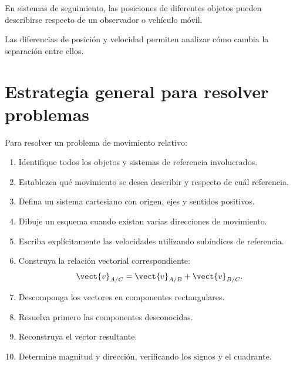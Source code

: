 \begin{aplicacion}

En sistemas de seguimiento, las posiciones
de diferentes objetos pueden describirse
respecto de un observador o vehículo móvil.

Las diferencias de posición y velocidad
permiten analizar cómo cambia la separación
entre ellos.

\end{aplicacion}


\section{Estrategia general para resolver problemas}

\begin{estrategia}

Para resolver un problema de movimiento relativo:

\begin{enumerate}

    \item Identifique todos los objetos y sistemas
    de referencia involucrados.

    \item Establezca qué movimiento se desea
    describir y respecto de cuál referencia.

    \item Defina un sistema cartesiano con origen,
    ejes y sentidos positivos.

    \item Dibuje un esquema cuando existan
    varias direcciones de movimiento.

    \item Escriba explícitamente las velocidades
    utilizando subíndices de referencia.

    \item Construya la relación vectorial
    correspondiente:
    \[
    \vect{v}_{A/C}
    =
    \vect{v}_{A/B}
    +
    \vect{v}_{B/C}.
    \]

    \item Descomponga los vectores en componentes
    rectangulares.

    \item Resuelva primero las componentes desconocidas.

    \item Reconstruya el vector resultante.

    \item Determine magnitud y dirección,
    verificando los signos y el cuadrante.


\end{enumerate}
\end{estrategia}
